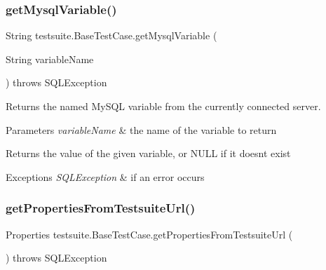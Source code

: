 \subsubsection{\texorpdfstring{get\+Mysql\+Variable()}{getMysqlVariable()}}
{\footnotesize\ttfamily String testsuite.\+Base\+Test\+Case.\+get\+Mysql\+Variable (\begin{DoxyParamCaption}\item[{String}]{variable\+Name }\end{DoxyParamCaption}) throws S\+Q\+L\+Exception\hspace{0.3cm}{\ttfamily [protected]}}

Returns the named My\+S\+QL variable from the currently connected server.


\begin{DoxyParams}{Parameters}
{\em variable\+Name} & the name of the variable to return\\
\hline
\end{DoxyParams}
\begin{DoxyReturn}{Returns}
the value of the given variable, or N\+U\+LL if it doesn\textquotesingle{}t exist
\end{DoxyReturn}

\begin{DoxyExceptions}{Exceptions}
{\em S\+Q\+L\+Exception} & if an error occurs \\
\hline
\end{DoxyExceptions}
\mbox{\label{classtestsuite_1_1_base_test_case_ab63fc653810c4915e190196e7b3d6e6c}} 
\subsubsection{\texorpdfstring{get\+Properties\+From\+Testsuite\+Url()}{getPropertiesFromTestsuiteUrl()}}
{\footnotesize\ttfamily Properties testsuite.\+Base\+Test\+Case.\+get\+Properties\+From\+Testsuite\+Url (\begin{DoxyParamCaption}{ }\end{DoxyParamCaption}) throws S\+Q\+L\+Exception\hspace{0.3cm}{\ttfamily [protected]}}

